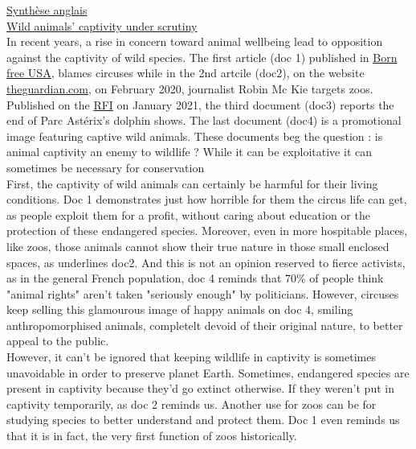 \documentclass{article}
\begin{document}
 \noindent
\Large \underline{Synthèse anglais}\\

\noindent
\normalsize \underline{Wild animals' captivity under scrutiny}\\

In recent years, a rise in concern toward animal wellbeing lead 
to opposition against the captivity of wild species. The first 
article (doc 1) published in \underline{Born free USA}, blames
circuses while in the 2nd artcile (doc2), on the website \underline{theguardian.com}, 
on February 2020, journalist Robin Mc Kie targets zoos. Published on the 
\underline{RFI} on January 2021, the third document (doc3) reports the end of Parc 
Astérix's dolphin shows. The last document (doc4) is a promotional image 
featuring captive wild animals. These documents beg the question : is animal captivity 
an enemy to wildlife ? While it can be exploitative it can sometimes be necessary for conservation\\

First, the captivity of wild animals can certainly be harmful for their living 
conditions. Doc 1 demonstrates just how horrible for them the circus life can get, as 
people exploit them for a profit, without caring about education or the protection 
of these endangered species. Moreover, even in more hospitable places,
like zoos, those animals cannot show their true nature in those 
small enclosed spaces, as underlines doc2. And this is not an opinion 
reserved to fierce activists, as in the general French population, 
doc 4 reminds that 70\% of people think "animal rights"
aren't taken "seriously enough" by politicians. However, circuses keep 
selling this glamourous image of happy animals on doc 4, smiling anthropomorphised 
animals, completelt devoid of their original nature, to better appeal to the public. \\

However, it can't be ignored that keeping wildlife in captivity 
is sometimes unavoidable in order to preserve planet 
Earth. Sometimes, endangered species are present 
in captivity because they'd go extinct otherwise. If they weren't 
put in captivity temporarily, as doc 2 reminds us. Another 
use for zoos can be for studying species to better 
understand and protect them. Doc 1 even reminds us that 
it is in fact, the very first function of zoos historically.
\end{document}
